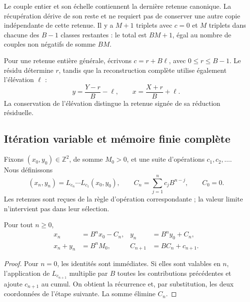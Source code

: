 Le couple entier et son échelle contiennent la dernière retenue canonique. La
récupération dérive de son reste et ne requiert pas de conserver une autre copie
indépendante de cette retenue. Il y a \(M+1\) triplets avec \(c=0\) et
\(M\) triplets dans chacune des \(B-1\) classes restantes : le total
est \(BM+1\), égal au nombre de couples non négatifs de somme \(BM\).

Pour une retenue entière générale, écrivons \(c=r+B\ell\), avec \(0\leq r\leq B-1\). Le résidu détermine \(r\), tandis que la reconstruction complète utilise également l'élévation \(\ell\) :
\begin{equation}
 y=\frac{Y-r}{B}-\ell,\qquad
 x=\frac{X+r}{B}+\ell.
 \label{lib03:elevacion}
\end{equation}
La conservation de l'élévation distingue la retenue signée de sa réduction résiduelle.

\subsection{Itération variable et mémoire finie complète}
\label{lib03:memoria}

Fixons \((x_0,y_0)\in\mathbb Z^2\), de somme \(M_0>0\), et une suite d'opérations \(c_1,c_2,\ldots\). Nous définissons
\begin{equation}
 (x_n,y_n)=L_{c_n}\cdots L_{c_1}(x_0,y_0),\qquad
 C_n=\sum_{j=1}^n c_jB^{n-j},\qquad C_0=0.
 \label{lib03:registro-acumulado}
\end{equation}
Les retenues sont reçues de la règle d'opération correspondante ; la valeur limite n'intervient pas dans leur sélection.

\begin{theorem}
\label{lib03:teo-acumulacion}
Pour tout \(n\geq0\),
\begin{equation}
 \begin{aligned}
 x_n&=B^nx_0-C_n,& y_n&=B^ny_0+C_n,\\
 x_n+y_n&=B^nM_0,& C_{n+1}&=BC_n+c_{n+1}.
 \end{aligned}
 \label{lib03:iteracion-exacta}
\end{equation}
\end{theorem}

\begin{proof}
Pour \(n=0\), les identités sont immédiates. Si elles sont valables en
\(n\), l’application de \(L_{c_{n+1}}\) multiplie par \(B\) toutes
les contributions précédentes et ajoute \(c_{n+1}\) au cumul.
On obtient la récurrence et, par substitution, les deux coordonnées de
l’étape suivante. La somme élimine \(C_n\).
\end{proof}

